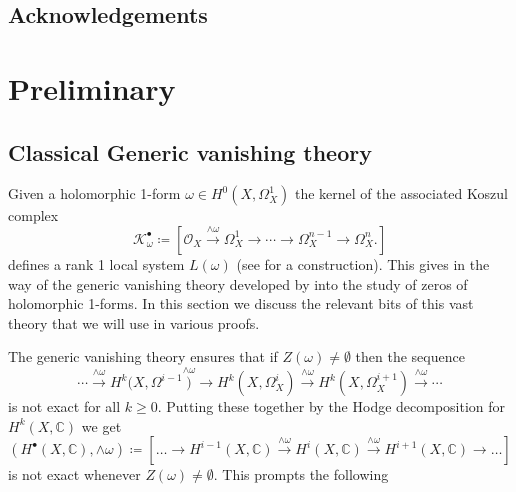 \documentclass[11pt,reqno]{amsart}
\theoremstyle{definition}
\newtheorem{definition}[theorem]{Definition}
\theoremstyle{remark}
\theoremstyle{cited}
\theoremstyle{citeddef}
\newcommand{\C}{\mathbb{C}}
\newcommand{\sK}{\mathcal{K}}
\newcommand{\sO}{\mathcal{O}}
\newcommand{\sZ}{\mathcal{Z}}
\newcommand{\bbC}{\mathbb{C}}
\begin{document}
\subsection*{Acknowledgements}



\section{Preliminary}
\subsection{Classical Generic vanishing theory}
Given a holomorphic 1-form $\omega\in H^0(X,\Omega_X^1)$
the kernel of the associated Koszul complex
\begin{equation}
\sK^{\bullet}_{\omega} \coloneqq [\sO_X\overset{\wedge\omega}{\to} \Omega_X^1 \to \cdots\to \Omega_X^{n-1}\to \Omega^n_X.]
\label{eq:koszul}
\end{equation}
defines a rank 1 local system $L(\omega)$ (see \cite[\S 2.1]{sch}
for a construction). This gives in the way of the generic vanishing theory developed by \cite{GL, Ara, Sim} into the 
study of zeros of holomorphic 1-forms. In this section we discuss 
the relevant bits of this vast theory that we will use in various
proofs.
%
%

 
The generic vanishing theory 
\cite[Proposition 3.4]{GL} ensures that
if $Z(\omega)\neq \emptyset$ then the sequence
\[\cdots\overset{\wedge\omega}{\to} H^k(X, \Omega^{i-1}
\overset{\wedge\omega}){\to}H^k(X, \Omega_X^{i})
\overset{\wedge\omega}{\to} H^k(X,\Omega_X^{i+1})
\overset{\wedge\omega}{\to}\cdots\]
is not exact for all $k\geq 0$. Putting these together 
by the Hodge decomposition for $H^k(X,\bbC)$ we get
\begin{equation}
(H^{\bullet}(X,\bbC), \wedge\omega)\coloneqq [\ldots\to H^{i-1}(X,\C)\overset{\wedge\omega}{\longrightarrow}H^{i}(X,\C)\overset{\wedge\omega}{\longrightarrow}H^{i+1}(X,\C)\to\ldots]
\label{eq:resonance}
\end{equation}
is not exact whenever $Z(\omega)\neq \emptyset$. This prompts the following
\end{document}
